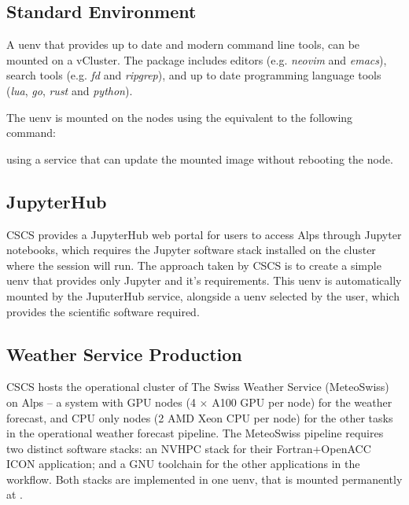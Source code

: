 \subsection{Standard Environment}

A uenv that provides up to date and modern command line tools, can be mounted on a vCluster.
The package includes editors (e.g. \emph{neovim} and \emph{emacs}), search tools (e.g. \emph{fd} and \emph{ripgrep}), and up to date programming language tools (\emph{lua}, \emph{go}, \emph{rust} and \emph{python}).

The uenv is mounted on the nodes using the equivalent to the following command:

using a service that can update the mounted image without rebooting the node.

\subsection{JupyterHub}

CSCS provides a JupyterHub web portal for users to access Alps through Jupyter notebooks, which requires the Jupyter software stack installed on the cluster where the session will run.
The approach taken by CSCS is to create a simple  uenv that provides only Jupyter and it's requirements.
This uenv is automatically mounted by the JuputerHub service, alongside a uenv selected by the user, which provides the scientific software required.

\subsection{Weather Service Production}

CSCS hosts the operational cluster of The Swiss Weather Service (MeteoSwiss) on Alps -- a system with GPU nodes (4 $\times$ A100 GPU per node) for the weather forecast, and CPU only nodes (2 AMD Xeon CPU per node) for the other tasks in the operational weather forecast pipeline.
The MeteoSwiss pipeline requires two distinct software stacks: an NVHPC stack for their Fortran+OpenACC ICON application; and a GNU toolchain for the other applications in the workflow.
Both stacks are implemented in one uenv, that is mounted permanently at .

